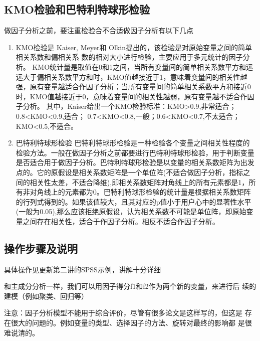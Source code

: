 \documentclass[12pt]{ctexart}
\numberwithin{equation}{section} %
\begin{document}
\subsection{KMO检验和巴特利特球形检验}
做因子分析之前，要注重检验合不合适做因子分析有以下几点
\begin{enumerate}
  \item KMO检验是 Kaiser, Meyer和 Olkin提出的，该检验是对原始变量之间的简单相关系数和偏相关系
数的相对大小进行检验，主要应用于多元统计的因子分析。
KMO统计量是取值在0和1之间，当所有变量间的简单相关系数平方和远远大于偏相关系数平方和时，KMO值越接近于1，意味着变量间的相关性越强，原有变量越适合作因子分析；当所有变量间的简单相关系数平方和接近0时，KMO值越接近于0，意味着变量间的相关性越弱，原有变量越不适合作因子分析。
其中，Kaiser给出一个KMO检验标准：KMO>0.9,非常适合；0.8<KMO<0.9,适合；
0.7{<}KMO<0.8,一般；0.6{<}KMO<0.7,不太适合；KMO<0.5,不适合。
\item 巴特利特球形检验
巴特利特球形检验是一种检验各个变量之间相关性程度的检验方法。一般在做因子分析之前都要进行巴特利特球形检验，用于判断变量是否适合用于做因子分析。巴特利特球形检验是以变量的相关系数矩阵为出发点的。它的原假设是相关系数矩阵是一个单位阵(不适合做因子分析，指标之间的相关性太差，不适合降维),即相关系数矩阵对角线上的所有元素都是1，所有非对角线上的元素都为0。巴特利特球形检验的统计量是根据相关系数矩阵的行列式得到的。如果该值较大，且其对应的p值小于用户心中的显著性水平(一般为0.05),那么应该拒绝原假设，认为相关系数不可能是单位阵，即原始变量之间存在相关性，适合于作因子分析。相反不适合作因子分析。

\end{enumerate}
\subsection{操作步骤及说明}
具体操作见\cite{清风}更新第二讲的SPSS示例，讲解十分详细

和主成分分析一样，我们可以用因子得分f1和f2作为两个新的变量，来进行后
续的建模（例如聚类、回归等）

注意：因子分析模型不能用于综合评价，尽管有很多论文是这样写的，但这是
存在很大的问题的。例如变量的类型、选择因子的方法、旋转对最终的影响都
是很难说清的。
\end{document}
